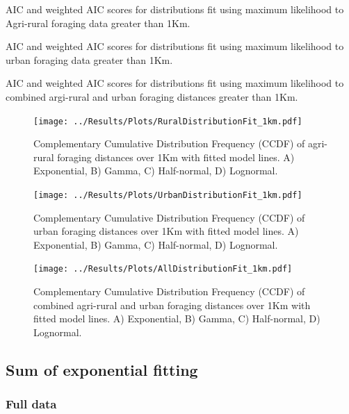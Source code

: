 \documentclass[11pt,usenames,dvipsnames]{article}
\begin{document}
\begin{table}[H]
	\centering
	\caption{AIC and weighted AIC scores for distributions fit using maximum likelihood to Agri-rural foraging data greater than 1Km.}
	
\end{table}
\begin{table}[H]
	\centering
	\caption{AIC and weighted AIC scores for distributions fit using maximum likelihood to urban foraging data greater than 1Km.}
	
\end{table}
\begin{table}[H]
	\centering
	\caption{AIC and weighted AIC scores for distributions fit using maximum likelihood to combined argi-rural and urban foraging distances greater than 1Km.}
	
\end{table}

\begin{figure}[H]
	\centering
	\texttt{[image: ../Results/Plots/RuralDistributionFit\_1km.pdf]}
	\caption{Complementary Cumulative Distribution Frequency (CCDF) of agri-rural foraging distances over 1Km with fitted model lines. A) Exponential, B) Gamma, C) Half-normal, D) Lognormal.}
\end{figure}
\begin{figure}[H]
	\centering
	\texttt{[image: ../Results/Plots/UrbanDistributionFit\_1km.pdf]}
	\caption{Complementary Cumulative Distribution Frequency (CCDF) of urban foraging distances over 1Km with fitted model lines. A) Exponential, B) Gamma, C) Half-normal, D) Lognormal.}
\end{figure}
\begin{figure}[H]
	\centering
	\texttt{[image: ../Results/Plots/AllDistributionFit\_1km.pdf]}
	\caption{Complementary Cumulative Distribution Frequency (CCDF) of combined agri-rural and urban foraging distances over 1Km with fitted model lines. A) Exponential, B) Gamma, C) Half-normal, D) Lognormal.}
\end{figure}

\subsection{Sum of exponential fitting}

\subsubsection{Full data}
\end{document}
